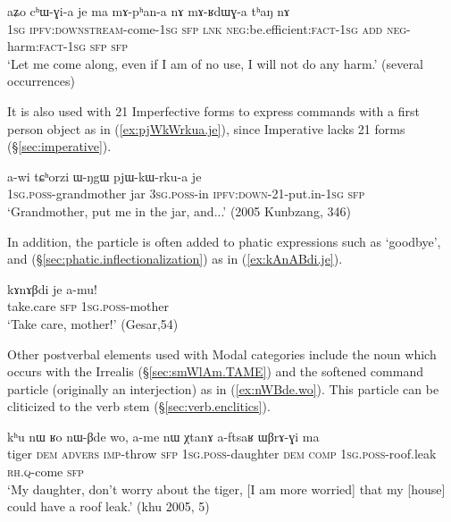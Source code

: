 \begin{exe}
\ex \label{ex:chWGia.je}
\gll  aʑo cʰɯ-ɣi-a je ma mɤ-pʰan-a nɤ mɤ-ʁdɯɣ-a tʰaŋ nɤ \\
\textsc{1sg} \textsc{ipfv}:\textsc{downstream}-come-\textsc{1sg} \textsc{sfp} \textsc{lnk} \textsc{neg}:be.efficient:\textsc{fact}-\textsc{1sg} \textsc{add} \textsc{neg}-harm:\textsc{fact}-\textsc{1sg} \textsc{sfp} \textsc{sfp} \\
\glt `Let me come along, even if I am of no use, I will not do any harm.' (several occurrences)
\end{exe}

It is also used with 2\fl{}1 Imperfective forms to express  commands with a first person object as in (\ref{ex:pjWkWrkua.je}), since Imperative lacks 2\fl{}1 forms (§\ref{sec:imperative}).

\begin{exe}
\ex \label{ex:pjWkWrkua.je}
\gll a-wi tɕʰorzi ɯ-ŋgɯ pjɯ-kɯ-rku-a je\\
\textsc{1sg}.\textsc{poss}-grandmother jar \textsc{3sg}.\textsc{poss}-in \textsc{ipfv}:\textsc{down}-2\fl{}1-put.in-\textsc{1sg} \textsc{sfp}\\
\glt `Grandmother, put me in the jar, and...' (2005 Kunbzang, 346)
\end{exe}

In addition, the particle  is often added to phatic expressions such as  `goodbye',  and  (§\ref{sec:phatic.inflectionalization}) as in (\ref{ex:kAnABdi.je}).


\begin{exe}
\ex \label{ex:kAnABdi.je}
\gll kɤnɤβdi je a-mu! \\
take.care \textsc{sfp} \textsc{1sg}.\textsc{poss}-mother \\
\glt `Take care, mother!' (Gesar,54)
\end{exe}

Other postverbal elements used with Modal categories include the noun  which occurs with the Irrealis (§\ref{sec:smWlAm.TAME}) and the softened command particle  (originally an interjection) as in (\ref{ex:nWBde.wo}). This particle can be cliticized to the verb stem (§\ref{sec:verb.enclitics}).

\begin{exe}
\ex \label{ex:nWBde.wo}
\gll  kʰu nɯ ʁo nɯ-βde wo, a-me nɯ χtanɤ a-ftsaʁ ɯβrɤ-ɣi ma \\
tiger \textsc{dem} \textsc{advers} \textsc{imp}-throw \textsc{sfp} \textsc{1sg}.\textsc{poss}-daughter \textsc{dem} \textsc{comp} \textsc{1sg}.\textsc{poss}-roof.leak \textsc{rh}.\textsc{q}-come \textsc{sfp} \\
\glt `My daughter, don't worry about the tiger, [I am more worried] that my [house] could have a roof leak.' (khu 2005, 5)
\end{exe}


